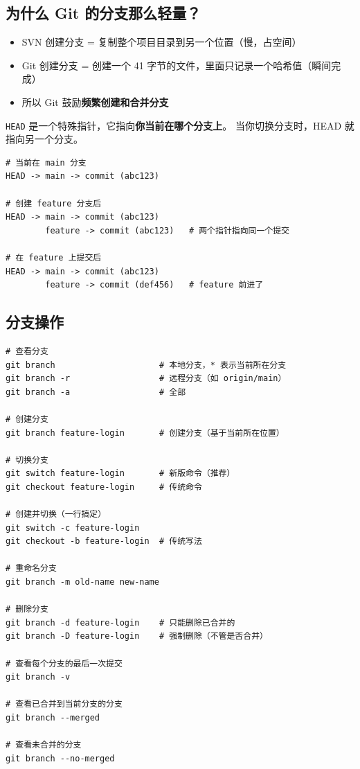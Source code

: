 \documentclass[12pt,a4paper]{article}
\begin{document}
\subsection{为什么 Git 的分支那么轻量？}

\begin{itemize}[itemsep=3pt]
    \item SVN 创建分支 = 复制整个项目目录到另一个位置（慢，占空间）
    \item Git 创建分支 = 创建一个 41 字节的文件，里面只记录一个哈希值（瞬间完成）
    \item 所以 Git 鼓励\textbf{频繁创建和合并分支}
\end{itemize}

\texttt{HEAD} 是一个特殊指针，它指向\textbf{你当前在哪个分支上}。
当你切换分支时，HEAD 就指向另一个分支。

\begin{lstlisting}[numbers=none]
# 当前在 main 分支
HEAD -> main -> commit (abc123)

# 创建 feature 分支后
HEAD -> main -> commit (abc123)
        feature -> commit (abc123)   # 两个指针指向同一个提交

# 在 feature 上提交后
HEAD -> main -> commit (abc123)
        feature -> commit (def456)   # feature 前进了
\end{lstlisting}

\subsection{分支操作}

\begin{lstlisting}
# 查看分支
git branch                     # 本地分支，* 表示当前所在分支
git branch -r                  # 远程分支（如 origin/main）
git branch -a                  # 全部

# 创建分支
git branch feature-login       # 创建分支（基于当前所在位置）

# 切换分支
git switch feature-login       # 新版命令（推荐）
git checkout feature-login     # 传统命令

# 创建并切换（一行搞定）
git switch -c feature-login
git checkout -b feature-login  # 传统写法

# 重命名分支
git branch -m old-name new-name

# 删除分支
git branch -d feature-login    # 只能删除已合并的
git branch -D feature-login    # 强制删除（不管是否合并）

# 查看每个分支的最后一次提交
git branch -v

# 查看已合并到当前分支的分支
git branch --merged

# 查看未合并的分支
git branch --no-merged
\end{lstlisting}
\end{document}
